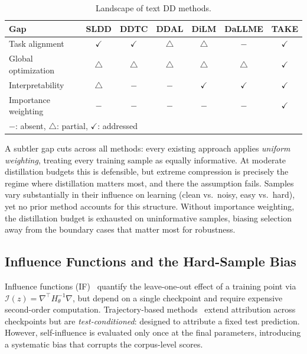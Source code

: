\begin{table}[ht] %
  \centering
  \caption{Landscape of text DD methods.}
  \label{tab:landscape-textdd-methods}
  \setlength{\tabcolsep}{6pt}
  \begin{tabular}{l c c c c c c}
    \toprule
    \textbf{Gap}         & SLDD         & DDTC         & DDAL         & DiLM         & DaLLME       & \textbf{TAKE} \\
    \midrule
    Task alignment       & $\checkmark$ & $\checkmark$ & $\triangle$  & $\triangle$  & $-$          & $\checkmark$ \\
    Global optimization  & $\triangle$  & $\triangle$  & $\triangle$  & $\triangle$  & $\triangle$  & $\checkmark$ \\
    Interpretability     & $\triangle$  & $-$          & $-$          & $\checkmark$ & $\checkmark$ & $\checkmark$ \\
    Importance weighting & $-$          & $-$          & $-$          & $-$          & $-$          & $\checkmark$ \\
    \bottomrule
    \multicolumn{7}{l}{$-$: absent, $\triangle$: partial, $\checkmark$: addressed}
  \end{tabular}
\end{table}

\begin{foldable} %
  A subtler gap cuts across all methods: every existing approach applies \emph{uniform weighting}, treating every training sample as equally informative.
  At moderate distillation budgets this is defensible, but extreme compression is precisely the regime where distillation matters most, and there the assumption fails.
  Samples vary substantially in their influence on learning (clean vs.\ noisy, easy vs.\ hard), yet no prior method accounts for this structure.
  Without importance weighting, the distillation budget is exhausted on uninformative samples, biasing selection away from the boundary cases that matter most for robustness.
\end{foldable}

\subsection{Influence Functions and the Hard-Sample Bias} \label{sec:02-related-influence}
\begin{foldable} %
  Influence functions (IF)~\cite{cook1982residuals,koh2017understanding} quantify the leave-one-out effect of a training point via $\mathcal{I}(z) = \nabla^\top H_\theta^{-1} \nabla$, but depend on a single checkpoint and require expensive second-order computation.
  Trajectory-based methods~\cite{pruthi2020estimating,park2023trak,kwon2023datainf} extend attribution across checkpoints but are \emph{test-conditioned}: designed to attribute a fixed test prediction.
  However, self-influence is evaluated only once at the final parameters, introducing a systematic bias that corrupts the corpus-level scores.
\end{foldable}


